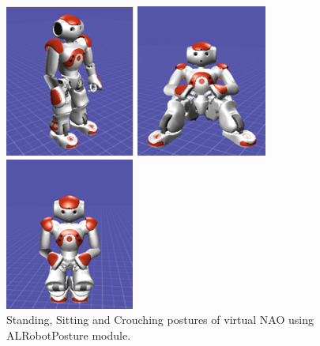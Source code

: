 \begin{figure}
	[h]
	\centering 
	\begin{minipage}
		{.3 
		\textwidth} \centering 
		\includegraphics[height=5cm]{figures/content/nao-stand.jpg} 
	\end{minipage}
	\begin{minipage}
		{.3 
		\textwidth} \centering 
		\includegraphics[height=5cm]{figures/content/nao-sit.jpg} 
	\end{minipage}
	\begin{minipage}
		{.3 
		\textwidth} \centering 
		\includegraphics[height=5cm]{figures/content/nao-crouch.jpg} 
	\end{minipage}
	\caption{Standing, Sitting and Crouching postures of virtual NAO using ALRobotPosture module. \cite{8}} \label{fg:nao:motion} 
\end{figure}
